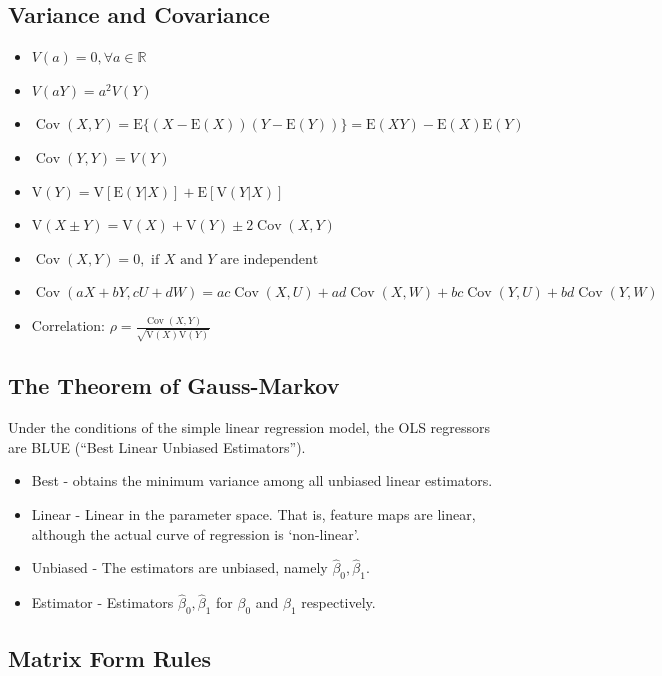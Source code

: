 \documentclass[10pt]{article}
\newcommand{\real}{\mathbb{R}}
\begin{document}
\subsection{Variance and Covariance}
\begin{itemize}
    \item $V(a) = 0, \forall a \in \real$
    \item $V(aY) = a^2V(Y)$
    \item $\operatorname{Cov}(X, Y)= \mathrm{E}\{(X-\mathrm{E}(X))(Y-\mathrm{E}(Y))\}=\mathrm{E}(X Y)-\mathrm{E}(X) \mathrm{E}(Y)$
    \item $\operatorname{Cov}(Y, Y)=V(Y)$
    \item $\mathrm{V}(Y)=\mathrm{V}[\mathrm{E}(Y | X)]+\mathrm{E}[\mathrm{V}(Y | X)]$
    \item $\mathrm{V}(X \pm Y)=\mathrm{V}(X)+\mathrm{V}(Y) \pm 2 \operatorname{Cov}(X, Y)$
    \item $\operatorname{Cov}(X, Y)=0, \text { if } X \text { and } Y \text { are independent }$
    \item $\operatorname{Cov}(a X+b Y, c U+d W)=a c \operatorname{Cov}(X, U)+a d \operatorname{Cov}(X, W)+b c \operatorname{Cov}(Y, U)+b d \operatorname{Cov}(Y, W)$
    \item $\text {Correlation: } \rho=\frac{\operatorname{Cov}(X, Y)}{\sqrt{\mathrm{V}(X) \mathrm{V}(Y)}}$
\end{itemize}

\subsection{The Theorem of Gauss-Markov}
Under the conditions of the simple linear regression model, the OLS regressors are BLUE (``Best Linear Unbiased Estimators'').
\begin{itemize}
    \item Best - obtains the minimum variance among all unbiased linear estimators. 
    \item Linear - Linear in the parameter space. That is, feature maps are linear, although the actual curve of regression is `non-linear'.
    \item Unbiased - The estimators are unbiased, namely $\hat{\beta}_0, \hat{\beta}_1$.
    \item Estimator - Estimators $\hat{\beta}_0, \hat{\beta}_1$ for $\beta_0$ and $\beta_1$ respectively.
\end{itemize}

\subsection{Matrix Form Rules}
\end{document}
